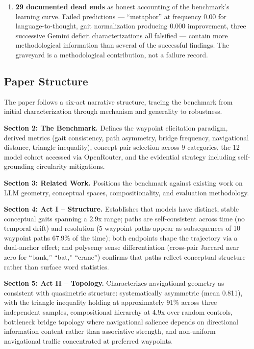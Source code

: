 \begin{enumerate}
\item
  \textbf{29 documented dead ends} as honest accounting of the benchmark's learning curve. Failed predictions --- ``metaphor'' at frequency 0.00 for language-to-thought, gait normalization producing 0.000 improvement, three successive Gemini deficit characterizations all falsified --- contain more methodological information than several of the successful findings. The graveyard is a methodological contribution, not a failure record.
\end{enumerate}

\subsection{Paper Structure}\label{paper-structure}

The paper follows a six-act narrative structure, tracing the benchmark from initial characterization through mechanism and generality to robustness.

\textbf{Section 2: The Benchmark.} Defines the waypoint elicitation paradigm, derived metrics (gait consistency, path asymmetry, bridge frequency, navigational distance, triangle inequality), concept pair selection across 9 categories, the 12-model cohort accessed via OpenRouter, and the evidential strategy including self-grounding circularity mitigations.

\textbf{Section 3: Related Work.} Positions the benchmark against existing work on LLM geometry, conceptual spaces, compositionality, and evaluation methodology.

\textbf{Section 4: Act I -- Structure.} Establishes that models have distinct, stable conceptual gaits spanning a 2.9x range; paths are self-consistent across time (no temporal drift) and resolution (5-waypoint paths appear as subsequences of 10-waypoint paths 67.9\% of the time); both endpoints shape the trajectory via a dual-anchor effect; and polysemy sense differentiation (cross-pair Jaccard near zero for ``bank,'' ``bat,'' ``crane'') confirms that paths reflect conceptual structure rather than surface word statistics.

\textbf{Section 5: Act II -- Topology.} Characterizes navigational geometry as consistent with quasimetric structure: systematically asymmetric (mean 0.811), with the triangle inequality holding at approximately 91\% across three independent samples, compositional hierarchy at 4.9x over random controls, bottleneck bridge topology where navigational salience depends on directional information content rather than associative strength, and non-uniform navigational traffic concentrated at preferred waypoints.

